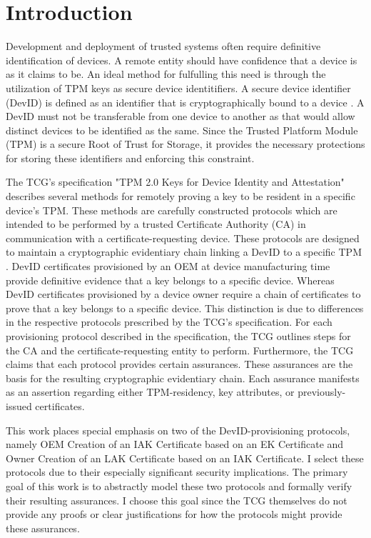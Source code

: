 \chapter{Introduction}



Development and deployment of trusted systems often require definitive identification of devices. A remote entity should have confidence that a device is as it claims to be. An ideal method for fulfulling this need is through the utilization of TPM keys as secure device identitifiers. A secure device identifier (DevID) is defined as an identifier that is cryptographically bound to a device \cite{DevIDSpec-IEEE}. 
A DevID must not be transferable from one device to another as that would allow distinct devices to be identified as the same. 
Since the Trusted Platform Module (TPM) is a secure Root of Trust for Storage, it provides the necessary protections for storing these identifiers and enforcing this constraint. 

The TCG's specification "TPM 2.0 Keys for Device Identity and Attestation" describes several methods for remotely proving a key to be resident in a specific device's TPM. These methods are carefully constructed protocols which are intended to be performed by a trusted Certificate Authority (CA) in communication with a certificate-requesting device. These protocols are designed to maintain a cryptographic evidentiary chain linking a DevID to a specific TPM \cite{DevIDSpec-TCG}. 
DevID certificates provisioned by an OEM at device manufacturing time provide definitive evidence that a key belongs to a specific device. Whereas DevID certificates provisioned by a device owner require a chain of certificates to prove that a key belongs to a specific device. This distinction is due to differences in the respective protocols prescribed by the TCG's specification. 
For each provisioning protocol described in the specification, the TCG outlines steps for the CA and the certificate-requesting entity to perform. Furthermore, the TCG claims that each protocol provides certain assurances. These assurances are the basis for the resulting cryptographic evidentiary chain.
Each assurance manifests as an assertion regarding either TPM-residency, key attributes, or previously-issued certificates.

This work places special emphasis on two of the DevID-provisioning protocols, namely OEM Creation of an IAK Certificate based on an EK Certificate and Owner Creation of an LAK Certificate based on an IAK Certificate. I select these protocols due to their especially significant security implications. The primary goal of this work is to abstractly model these two protocols and formally verify their resulting assurances. I choose this goal since the TCG themselves do not provide any proofs or clear justifications for how the protocols might provide these assurances. 




